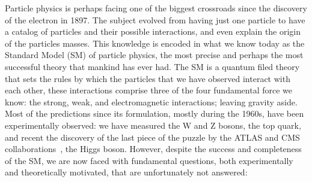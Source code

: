 Particle physics is perhaps facing one of the biggest crossroads since
the discovery of the electron in 1897. The subject evolved from having
just one particle to have a catalog of particles and their possible
interactions, and even explain the origin of the particles
masses. This knowledge is encoded in what we know today as the
Standard Model (SM) of particle physics, the most precise and perhaps
the most successful theory that mankind has ever had. The SM is a
quantum filed theory that sets the
rules by which the particles that we have observed interact with each
other, these interactions comprise three of the four fundamental force
we know: the strong, weak, and electromagnetic interactions; leaving
gravity aside. Most of the predictions since its formulation, mostly
during the 1960s, have been experimentally observed: we have measured the W and Z
bosons, the top quark, and recent the discovery of the last piece of
the puzzle by the ATLAS and CMS
collaborations~\cite{CMSHIGGS,ATLASHIGGS}, the Higgs boson. However, despite the success and completeness of
the SM, we are now faced with fundamental questions, both experimentally and theoretically motivated, 
that are unfortunately not answered:

